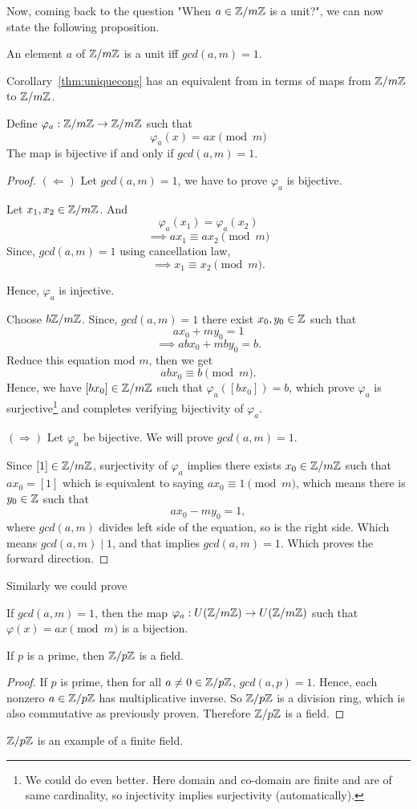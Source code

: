 Now, coming back to the question "When $a \in \mathbb{Z}/m\mathbb{Z}$ is a unit?", we can now state the following proposition.
\begin{prop}
    An element $a$ of $\mathbb{Z}/m\mathbb{Z}$ is a unit iff $gcd(a,m) = 1$.
\end{prop}

Corollary~\ref{thm:uniquecong} has an equivalent from in terms of maps from $\mathbb{Z}/m\mathbb{Z}$ to $\mathbb{Z}/m\mathbb{Z}$.

\begin{corollary}\label{cor:phi_a}
    Define $\varphi_a:\mathbb{Z}/m\mathbb{Z} \rightarrow \mathbb{Z}/m\mathbb{Z}$ such that \[\varphi_a(x) = ax \pmod{m}\]
    The map is bijective if and only if $gcd(a, m) = 1$.
\end{corollary}
\begin{proof}
    $(\Leftarrow)$ Let $gcd(a,m) = 1$, we have to prove $\varphi_a$ is bijective.

    Let $x_1, x_2 \in \mathbb{Z}/m\mathbb{Z}$. And 
    \[\varphi_a(x_1) = \varphi_a(x_2)\]
    \[\implies ax_1 \equiv ax_2 \pmod{m}\]
    Since, $gcd(a,m) = 1$ using cancellation law,
    \[\implies x_1 \equiv x_2 \pmod{m}.\]

    Hence, $\varphi_a$ is injective. 

    Choose $b \mathbb{Z}/m\mathbb{Z}$. Since, $gcd(a,m) = 1$ there exist $x_0, y_0 \in \mathbb{Z}$ such that
    \[ax_0 + my_0 = 1\]
    \[\implies abx_0 + mby_0 = b.\]
    Reduce this equation mod $m$, then we get
    \[abx_0 \equiv b \pmod{m}.\]
    Hence, we have $[bx_0] \in \mathbb{Z}/m\mathbb{Z}$ such that $\varphi_a([bx_0]) = b$, which prove $\varphi_a$ is surjective\footnote[1]{We could do even better. Here domain and co-domain are finite and are of same cardinality, so injectivity implies surjectivity (automatically).} and completes verifying bijectivity of $\varphi_a$.

    $(\Rightarrow)$ Let $\varphi_a$ be bijective. We will prove $gcd(a, m) = 1$. 

    Since $[1] \in \mathbb{Z}/m\mathbb{Z}$, surjectivity of $\varphi_a$ implies there exists $x_0 \in \mathbb{Z}/m\mathbb{Z}$ such that $ax_0 = [1]$ which is equivalent to saying $ax_0 \equiv 1 \pmod{m}$, which means there is $y_0 \in \mathbb{Z}$ such that 
    \[ax_0 - my_0  =1,\]
    where $gcd(a,m)$ divides left side of the equation, so is the right side. Which means $gcd(a, m) \mid 1$, and that implies $gcd(a,m) = 1$. Which proves the forward direction.
\end{proof}
Similarly we could prove
\begin{corollary}\label{cor:unitbijection}
    If $gcd(a, m) = 1$, then the map $\varphi_a: U(\mathbb{Z}/m\mathbb{Z}) \rightarrow U(\mathbb{Z}/m\mathbb{Z})$ such that $\varphi(x) = ax \pmod{m}$ is a bijection.
\end{corollary}

\begin{prop}
    If $p$ is a prime, then $\mathbb{Z}/p\mathbb{Z}$ is a field.
\end{prop}
\begin{proof}
    If $p$ is prime, then for all $a \neq 0 \in \mathbb{Z}/p\mathbb{Z}$, $gcd(a, p) = 1$. Hence, each nonzero $a \in \mathbb{Z}/p\mathbb{Z}$ has multiplicative inverse. So $\mathbb{Z}/p\mathbb{Z}$ is a division ring, which is also commutative as previously proven. Therefore $\mathbb{Z}/p\mathbb{Z}$ is a field.
\end{proof}
$\mathbb{Z}/p\mathbb{Z}$ is an example of a finite field.
